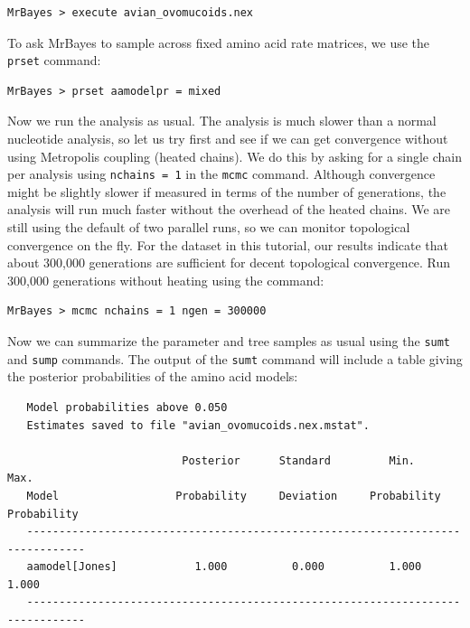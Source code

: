 \documentclass[12pt]{book}
\newcommand{\ttt}[1]{\texttt{#1} }
\begin{document}
\begin{verbatim}
MrBayes > execute avian_ovomucoids.nex
\end{verbatim}

To ask MrBayes to sample across fixed amino acid rate matrices, we use the \ttt{prset} command:

\begin{verbatim}
MrBayes > prset aamodelpr = mixed
\end{verbatim}

Now we run the analysis as usual. The analysis is much slower than a normal nucleotide analysis, so
let us try first and see if we can get convergence without using Metropolis coupling (heated chains).
We do this by asking for a single chain per analysis using \ttt{nchains = 1} in
the \ttt{mcmc} command. Although convergence might be slightly slower if measured in terms of the
number of generations, the analysis will run much faster without the overhead of the heated chains.
We are still using the default of two parallel runs, so we can monitor topological convergence on the fly.
For the dataset in this tutorial, our results indicate that about 300,000 generations are sufficient for
decent topological convergence. Run 300,000 generations without heating using the command:

\begin{verbatim}
MrBayes > mcmc nchains = 1 ngen = 300000
\end{verbatim}

Now we can summarize the parameter and tree samples as usual using the \ttt{sumt} and \ttt{sump}
commands. The output of the \ttt{sumt} command will include a table giving the posterior probabilities
of the amino acid models:


\begin{singlespacing}
\scriptsize
\begin{verbatim}
   Model probabilities above 0.050
   Estimates saved to file "avian_ovomucoids.nex.mstat".

                           Posterior      Standard         Min.           Max.   
   Model                  Probability     Deviation     Probability    Probability
   -------------------------------------------------------------------------------
   aamodel[Jones]            1.000          0.000          1.000          1.000
   -------------------------------------------------------------------------------
\end{verbatim}
\normalsize
\end{singlespacing}
\end{document}
